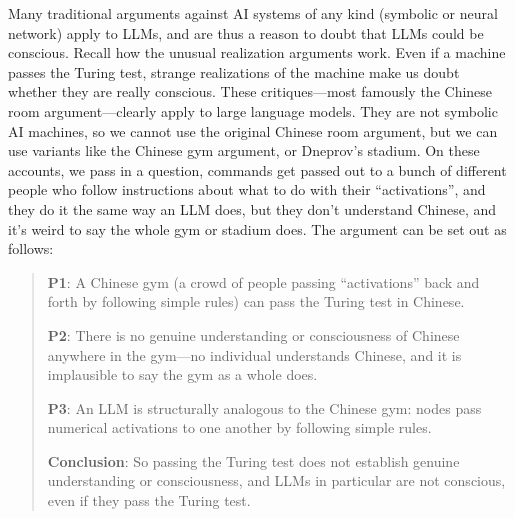 
Many traditional arguments against AI systems of any kind (symbolic or neural network) apply to LLMs, and are thus a reason to doubt that LLMs could be conscious. Recall how the unusual realization arguments work. Even if a machine passes the Turing test, strange realizations of the machine make us doubt whether they are really conscious. These critiques---most famously the Chinese room argument---clearly apply to large language models. They are not symbolic AI machines, so we cannot use the original Chinese room argument, but we can use variants like the Chinese gym argument, or Dneprov's stadium. On these accounts, we pass in a question, commands get passed out to a bunch of different people who follow instructions about what to do with their ``activations'', and they do it the same way an LLM does, but they don't understand Chinese, and it's weird to say the whole gym or stadium does. The argument can be set out as follows:

\begin{quote}
\textbf{P1}: A Chinese gym (a crowd of people passing ``activations'' back and forth by following simple rules) can pass the Turing test in Chinese.

\textbf{P2}: There is no genuine understanding or consciousness of Chinese anywhere in the gym---no individual understands Chinese, and it is implausible to say the gym as a whole does.

\textbf{P3}: An LLM is structurally analogous to the Chinese gym: nodes pass numerical activations to one another by following simple rules.

\textbf{Conclusion}: So passing the Turing test does not establish genuine understanding or consciousness, and LLMs in particular are not conscious, even if they pass the Turing test.
\end{quote}



